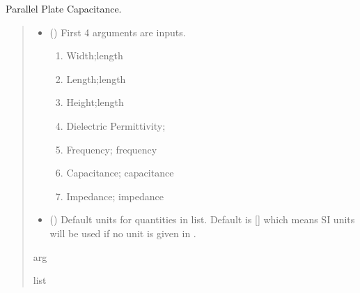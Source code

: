 \documentclass[letterpaper,10pt,english]{sphinxmanual}
\begin{document}

\begin{fulllineitems}
\label{\detokenize{components:components.ParallelPlateCap}}
\pysigstartsignatures
{}
\pysigstopsignatures
\sphinxAtStartPar
Parallel Plate Capacitance.
\begin{quote}\begin{description}
\begin{itemize}
\item {}
\sphinxAtStartPar
{} () \textendash{}
\sphinxAtStartPar
First 4 arguments are inputs.
\begin{enumerate}
%
\item {}
\sphinxAtStartPar
Width;length

\item {}
\sphinxAtStartPar
Length;length

\item {}
\sphinxAtStartPar
Height;length

\item {}
\sphinxAtStartPar
Dielectric Permittivity;

\item {}
\sphinxAtStartPar
Frequency; frequency

\item {}
\sphinxAtStartPar
Capacitance; capacitance

\item {}
\sphinxAtStartPar
Impedance; impedance

\end{enumerate}


\item {}
\sphinxAtStartPar
{} (\sphinxstyleliteralemphasis{\sphinxupquote{, }}) \textendash{} Default units for quantities in  list. Default is {[}{]} which means SI units will be used if no unit is given in .

\end{itemize}

\sphinxAtStartPar
arg

\sphinxAtStartPar
list

\end{description}\end{quote}

\end{fulllineitems}
\end{document}
